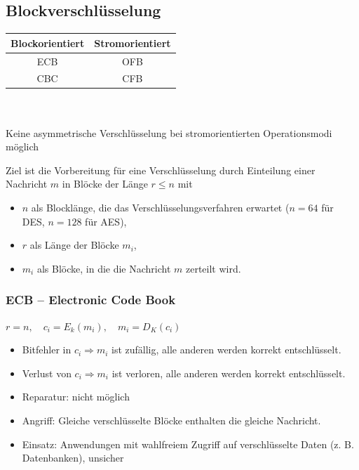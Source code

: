 \documentclass[8pt,a4paper,landscape]{article}
\begin{document}
\begin{multicols}{4}
\subsection{Blockverschlüsselung}
\begin{center}
\begin{tabular}{ c | c }
  \textbf{Blockorientiert} & \textbf{Stromorientiert} \\
  \hline
  ECB & OFB  \\
  CBC & CFB  \\
\end{tabular}
\small \\~\\Keine asymmetrische Verschlüsselung bei stromorientierten Operationsmodi möglich
\end{center}
Ziel ist die Vorbereitung für eine Verschlüsselung durch Einteilung einer Nachricht $m$ in Blöcke der Länge $r \leq n$ mit \begin{itemize}[itemsep=1pt] 
 \item $n$ als Blocklänge, die das Verschlüsselungsverfahren erwartet ($n = 64$ für DES, $n = 128$ für AES), 
 \item $r$ als Länge der Blöcke $m_i$,
 \item $m_i$ als Blöcke, in die die Nachricht $m$ zerteilt wird.
 \end{itemize}

\subsubsection{ECB – Electronic Code Book} 
\(r=n, \quad c_i = E_k(m_i), \quad m_i = D_K(c_i)\)\begin{itemize}[itemsep=1pt]
\item Bitfehler in \(c_i \Rightarrow m_i \) ist zufällig, alle anderen werden korrekt entschlüsselt. 
\item Verlust von \(c_i \Rightarrow m_i \) ist verloren, alle anderen werden korrekt entschlüsselt. 
\item Reparatur: nicht möglich
\item Angriff: Gleiche verschlüsselte Blöcke enthalten die gleiche Nachricht. 
\item Einsatz: Anwendungen mit wahlfreiem Zugriff auf verschlüsselte Daten (z. B. Datenbanken), unsicher
\end{itemize}


\end{multicols}
\end{document}
